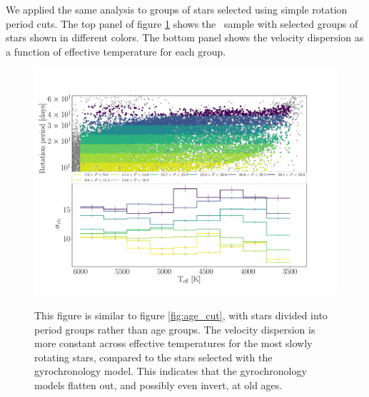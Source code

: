 We applied the same analysis to groups of stars selected using simple rotation
period cuts.
The top panel of figure \ref{fig:period_cut} shows the \mct\ sample with
selected groups of stars shown in different colors.
The bottom panel shows the velocity dispersion as a function of effective
temperature for each group.
\begin{figure}
  \caption{
This figure is similar to figure \ref{fig:age_cut}, with stars divided into
    period groups rather than age groups.
The velocity dispersion is more constant across effective temperatures for the
    most slowly rotating stars, compared to the stars selected with the
    \citet{angus2018} gyrochronology model.
    This indicates that the gyrochronology models flatten out, and possibly
    even invert, at old ages.
}
  \centering
    \includegraphics[width=1\textwidth]{period_cut}
\label{fig:period_cut}
\end{figure}




